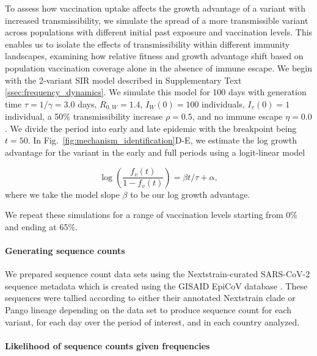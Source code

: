 \documentclass[11pt,oneside,letterpaper]{article}
\newcommand{\wt}{W}
\newcommand{\varEscape}{\eta}
\newcommand{\varTransmission}{\rho}
\begin{document}
To assess how vaccination uptake affects the growth advantage of a variant with increased transmissibility, we simulate the spread of a more transmissible variant across populations with different initial past exposure and vaccination levels.
This enables us to isolate the effects of transmissibility within different immunity landscapes, examining how relative fitness and growth advantage shift based on population vaccination coverage alone in the absence of immune escape.
We begin with the 2-variant SIR model described in Supplementary Text \ref{ssec:frequency_dynamics}.
We simulate this model for 100 days with generation time $\tau = 1 / \gamma = 3.0$ days, $R_{0, \wt} = 1.4$, $I_{\wt}(0) = 100$ individuals, $I_v(0) = 1$ individual, a 50\% transmissibility increase $\varTransmission=0.5$, and no immune escape $\varEscape=0.0$.
We divide the period into early and late epidemic with the breakpoint being $t=50$.
In Fig.~\ref{fig:mechanism_identification}D-E, we estimate the log growth advantage for the variant in the early and full periods using a logit-linear model

\begin{equation}
\log \left( \frac{f_v(t)}{1 - f_v(t)} \right) = \beta t / \tau + \alpha,
\end{equation}
where we take the model slope $\beta$ to be our log growth advantage.

We repeat these simulations for a range of vaccination levels starting from 0\% and ending at 65\%.

\paragraph{Generating sequence counts}

We prepared sequence count data sets using the Nextstrain-curated SARS-CoV-2 sequence metadata \cite{Hadfield2018} which is created using the GISAID EpiCoV database \cite{khare2021gisaid}.
These sequences were tallied according to either their annotated Nextstrain clade or Pango lineage \cite{aksamentov2021nextclade} depending on the data set to produce sequence count for each variant, for each day over the period of interest, and in each country analyzed.

\paragraph{Likelihood of sequence counts given frequencies}
\end{document}
